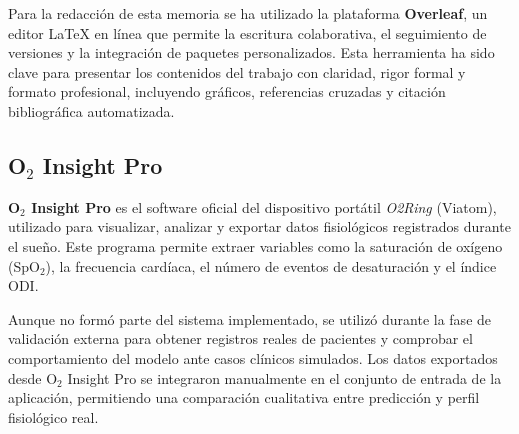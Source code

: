 Para la redacción de esta memoria se ha utilizado la plataforma \textbf{Overleaf}, un editor LaTeX en línea que permite la escritura colaborativa, el seguimiento de versiones y la integración de paquetes personalizados. Esta herramienta ha sido clave para presentar los contenidos del trabajo con claridad, rigor formal y formato profesional, incluyendo gráficos, referencias cruzadas y citación bibliográfica automatizada.

\subsection{O$_2$ Insight Pro}

\textbf{O$_2$ Insight Pro} es el software oficial del dispositivo portátil \textit{O2Ring} (Viatom), utilizado para visualizar, analizar y exportar datos fisiológicos registrados durante el sueño. Este programa permite extraer variables como la saturación de oxígeno (SpO$_2$), la frecuencia cardíaca, el número de eventos de desaturación y el índice ODI.

Aunque no formó parte del sistema implementado, se utilizó durante la fase de validación externa para obtener registros reales de pacientes y comprobar el comportamiento del modelo ante casos clínicos simulados. Los datos exportados desde O$_2$ Insight Pro se integraron manualmente en el conjunto de entrada de la aplicación, permitiendo una comparación cualitativa entre predicción y perfil fisiológico real.